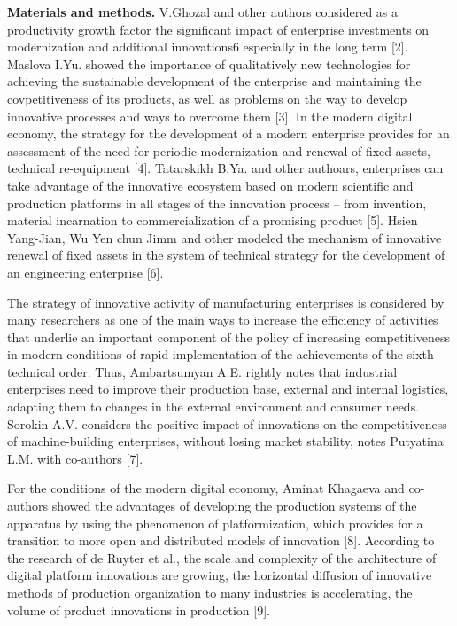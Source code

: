 {{{\bfseries Materials and methods.} V.Ghozal and other authors considered as
a productivity growth factor the significant impact of enterprise
investments on modernization and additional innovations6 especially in
the long term {[}2{]}. Maslova I.Yu. showed the importance of
qualitatively new technologies for achieving the sustainable development
of the enterprise and maintaining the covpetitiveness of its products,
as well as problems on the way to develop innovative processes and ways
to overcome them {[}3{]}. In the modern digital economy, the strategy
for the development of a modern enterprise provides for an assessment of
the need for periodic modernization and renewal of fixed assets,
technical re-equipment {[}4{]}. Tatarskikh B.Ya. and other authoars,
enterprises can take advantage of the innovative ecosystem based on
modern scientific and production platforms in all stages of the
innovation process -- from invention, material incarnation to
commercialization of a promising product {[}5{]}. Hsien Yang-Jian, Wu
Yen chun Jimm and other modeled the mechanism of innovative renewal of
fixed assets in the system of technical strategy for the development of
an engineering enterprise {[}6{]}.

The strategy of innovative activity of manufacturing enterprises is
considered by many researchers as one of the main ways to increase the
efficiency of activities that underlie an important component of the
policy of increasing competitiveness in modern conditions of rapid
implementation of the achievements of the sixth technical order. Thus,
Ambartsumyan A.E. rightly notes that industrial enterprises need to
improve their production base, external and internal logistics, adapting
them to changes in the external environment and consumer needs. Sorokin
A.V. considers the positive impact of innovations on the competitiveness
of machine-building enterprises, without losing market stability, notes
Putyatina L.M. with co-authors {[}7{]}.

For the conditions of the modern digital economy, Aminat Khagaeva and
co-authors showed the advantages of developing the production systems of
the apparatus by using the phenomenon of platformization, which provides
for a transition to more open and distributed models of innovation
{[}8{]}. According to the research of de Ruyter et al., the scale and
complexity of the architecture of digital platform innovations are
growing, the horizontal diffusion of innovative methods of production
organization to many industries is accelerating, the volume of product
innovations in production {[}9{]}.

}}
